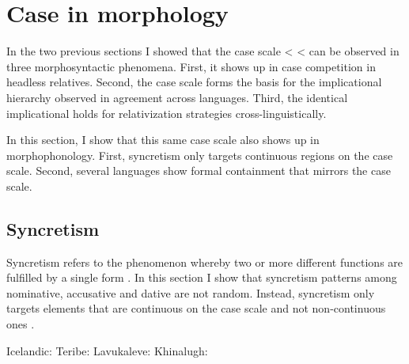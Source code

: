 \section{Case in morphology}\label{sec:case-morphology}

In the two previous sections I showed that the case scale  <  <  can be observed in three morphosyntactic phenomena. First, it shows up in case competition in headless relatives. Second, the case scale forms the basis for the implicational hierarchy observed in agreement across languages. Third, the identical implicational holds for relativization strategies cross-linguistically.

In this section, I show that this same case scale also shows up in morphophonology. First, syncretism only targets continuous regions on the case scale. Second, several languages show formal containment that mirrors the case scale.


\subsection{Syncretism}

Syncretism refers to the phenomenon whereby two or more different functions are fulfilled by a single form \citep{baerman2002}. In this section I show that syncretism patterns among nominative, accusative and dative are not random. Instead, syncretism only targets elements that are continuous on the case scale and not non-continuous ones \citep{baerman2005,caha2009,zompi2017,mcfadden2018,smith2019case}.



Icelandic: 
Teribe:
Lavukaleve: %
Khinalugh: %


